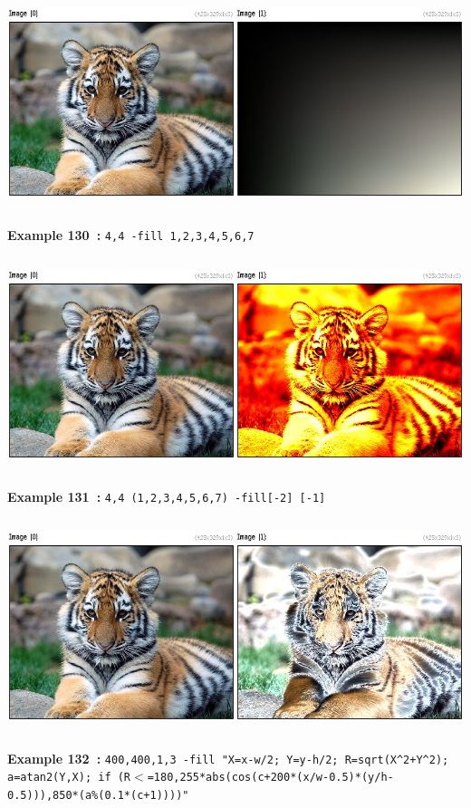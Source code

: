 \documentclass[a4paper,11pt,twoside]{book}
\begin{document}
\begin{center}\includegraphics[keepaspectratio=true,height=7cm,width=\textwidth]{img/gmic_def130.jpg}\\
{\footnotesize \textbf{Example 130~:} \texttt{4,4 -fill 1,2,3,4,5,6,7}}
\\\includegraphics[keepaspectratio=true,height=7cm,width=\textwidth]{img/gmic_def131.jpg}\\
{\footnotesize \textbf{Example 131~:} \texttt{4,4 (1,2,3,4,5,6,7) -fill[-2] [-1]}}
\\\includegraphics[keepaspectratio=true,height=7cm,width=\textwidth]{img/gmic_def132.jpg}\\
{\footnotesize \textbf{Example 132~:} \texttt{400,400,1,3 -fill "X=x-w/2; Y=y-h/2; R=sqrt(X\textasciicircum 2+Y\textasciicircum 2); a=atan2(Y,X); if (R$<$=180,255*abs(cos(c+200*(x/w-0.5)*(y/h-0.5))),850*(a\%(0.1*(c+1))))"}}
\end{center}
\end{document}
